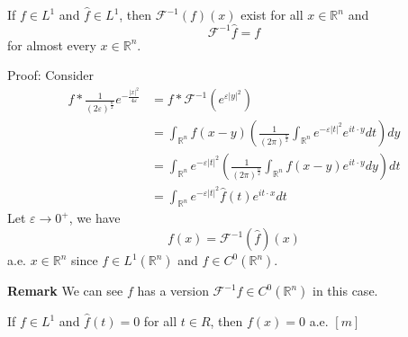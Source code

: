 \documentclass[12pt, a4paper, oneside]{book}
\begin{document}
\begin{theorem}
    If $f \in L^1$ and $\hat{f} \in L^1$, then $\mathcal{F}^{-1}(f)(x)$ exist for all $x\in \mathbb{R}^n$ and
    $$
        \mathcal{F}^{-1}\hat{f} = f
    $$
    for almost every $x \in \mathbb{R}^n$.

    Proof:
    Consider
    \begin{equation*}
        \begin{aligned}
            f*\frac{1}{\left(2\varepsilon\right)^{\frac{n}{2}}} e^{-\frac{\left|x\right|^2}{4\varepsilon}}
             & =
            f*\mathcal{F}^{-1}(e^{\varepsilon\left|y\right|^2})                                                                                                             \\
             & =\int_{\mathbb{R}^n} f(x-y) \left(\frac{1}{\left(2 \pi \right)^\frac{n}{2}}\int_{\mathbb{R}^n} e^{-\varepsilon \left|t\right|^2} e^{it\cdot y} dt \right)dy  \\
             & =\int_{\mathbb{R}^n} e^{-\varepsilon \left|t\right|^2}\left( \frac{1}{\left(2 \pi \right)^\frac{n}{2}}\int_{\mathbb{R}^n} f(x-y) e^{it\cdot y} dy \right) dt \\
             & = \int_{\mathbb{R}^n} e^{-\varepsilon \left|t\right|^2} \hat{f}(t) e^{i t\cdot x} dt
        \end{aligned}
    \end{equation*}
    Let $\varepsilon \to 0^+$, we have
    \begin{equation*}
        f(x)
        =
        \mathcal{F}^{-1}(\hat{f})(x)
    \end{equation*}
    a.e. $x\in \mathbb{R}^n$ since $f\in L^1(\mathbb{R}^n)$ and $\hat{f}\in C^0(\mathbb{R}^n)$.

    \textbf{Remark} We can see $f$ has a version $\mathcal{F}^{-1}f \in C^0(\mathbb{R}^n)$ in this case.
\end{theorem}
\begin{theorem}
    If $f \in L^1$ and $\hat{f}(t)=0$ for all $t \in R$, then $f(x)=0$ a.e. $[m]$
\end{theorem}
\end{document}
